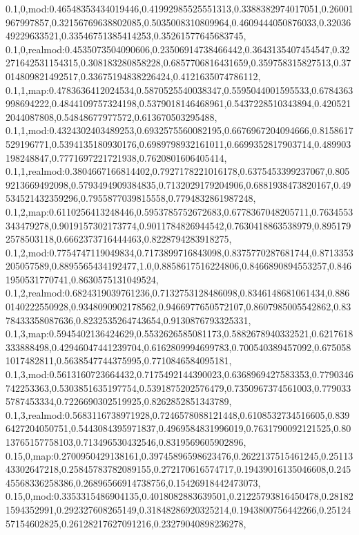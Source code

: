0.1,0,mod:0.46548353434019446,0.41992985525551313,0.3388382974017051,0.26001967997857,0.32156769638802085,0.5035008310809964,0.4609444050876033,0.3203649229633521,0.33546751385414253,0.35261577645683745,
0.1,0,realmod:0.4535073504090606,0.23506914738466442,0.3643135407454547,0.32271642531154315,0.308183280858228,0.6857706816431659,0.359758315827513,0.37014809821492517,0.33675194838226424,0.4121635074786112,
0.1,1,map:0.4783636412024534,0.5870525540038347,0.5595044001595533,0.6784363998694222,0.4844109757324198,0.5379018146468961,0.5437228510343894,0.4205212044087808,0.54848677977572,0.613670503295488,
0.1,1,mod:0.4324302403489253,0.6932575560082195,0.6676967204094666,0.8158617529196771,0.5394135180930176,0.6989798932161011,0.6699352817903714,0.489903198248847,0.7771697221721938,0.7620801606405414,
0.1,1,realmod:0.3804667166814402,0.7927178221016178,0.6375453399237067,0.8059213669492098,0.5793494909384835,0.7132029179204906,0.6881938473820167,0.49534521432359296,0.7955877039815558,0.7794832861987248,
0.1,2,map:0.6110256413248446,0.5953785752672683,0.6778367048205711,0.7634553343479278,0.9019157302173774,0.9011784826944542,0.7630418863538979,0.8951792578503118,0.6662373716444463,0.8228794283918275,
0.1,2,mod:0.7754747119049834,0.7173899716843098,0.8375770287681744,0.8713353205057589,0.8895565434192477,1.0,0.8858617516224806,0.8466890894553257,0.8461950531770741,0.8630575131049524,
0.1,2,realmod:0.6824319039761236,0.7132753128486098,0.8346148681061434,0.8860140222550928,0.9348090902178562,0.9466977650572107,0.8607985005542862,0.8378433358087636,0.8232535264743654,0.9130876793325331,
0.1,3,map:0.5945402136424629,0.5532626585081173,0.5882678940332521,0.6217618333888498,0.42946047441239704,0.6162809994699783,0.700540389457092,0.6750581017482811,0.5638547744375995,0.7710846584095181,
0.1,3,mod:0.5613160723664432,0.7175492144390023,0.6368969427583353,0.7790346742253363,0.5303851635197754,0.5391875202576479,0.7350967374561003,0.7790335787453334,0.7226690302519925,0.8262852851343789,
0.1,3,realmod:0.5683116738971928,0.7246578088121448,0.6108532734516605,0.8396427204050751,0.5443084395971837,0.4969584831996019,0.7631790092121525,0.8013765157758103,0.713496530432546,0.8319569605902896,
0.15,0,map:0.2700950429138161,0.39745896598623476,0.2622137515461245,0.2511343302647218,0.25845783782089155,0.272170616574717,0.19439016135046608,0.24545568336258386,0.26896566914738756,0.15426918442473073,
0.15,0,mod:0.3353315486904135,0.4018082883639501,0.21225793816450478,0.281821594352991,0.292327608265149,0.31848286920325214,0.1943800756442266,0.2512457154602825,0.26128217627091216,0.23279040898236278,
